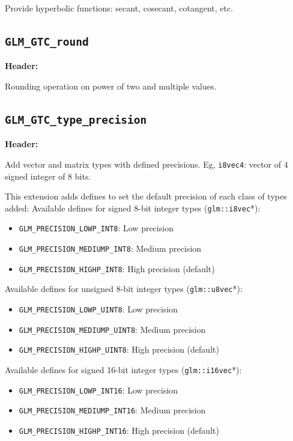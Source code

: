 \documentclass{scrartcl}
\numberwithin{figure}{subsection}
\begin{document}
Provide hyperbolic functions: secant, cosecant, cotangent, etc.

\subsection{\texttt{GLM\_GTC\_round}}
\textbf{Header:} 

Rounding operation on power of two and multiple values.


\subsection{\texttt{GLM\_GTC\_type\_precision}}
\textbf{Header:} 

Add vector and matrix types with defined precisions. Eg, \verb|i8vec4|: vector of 4 signed integer of 8 bits.

This extension adds defines to set the default precision of each class of types added:
Available defines for signed 8-bit integer types (\verb|glm::i8vec|*):

\begin{itemize}
    \item \verb|GLM_PRECISION_LOWP_INT8|: Low precision
    \item \verb|GLM_PRECISION_MEDIUMP_INT8|: Medium precision 
    \item \verb|GLM_PRECISION_HIGHP_INT8|: High precision (default)
\end{itemize}

Available defines for unsigned 8-bit integer types (\verb|glm::u8vec|*):

\begin{itemize}
    \item \verb|GLM_PRECISION_LOWP_UINT8|: Low precision
    \item \verb|GLM_PRECISION_MEDIUMP_UINT8|: Medium precision 
    \item \verb|GLM_PRECISION_HIGHP_UINT8|: High precision (default)
\end{itemize}

Available defines for signed 16-bit integer types (\verb|glm::i16vec|*):

\begin{itemize}
    \item \verb|GLM_PRECISION_LOWP_INT16|: Low precision
    \item \verb|GLM_PRECISION_MEDIUMP_INT16|: Medium precision 
    \item \verb|GLM_PRECISION_HIGHP_INT16|: High precision (default)
\end{itemize}
\end{document}
